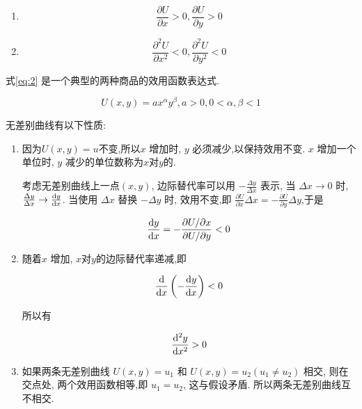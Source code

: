 \documentclass{article}
\begin{document}
\begin{enumerate}
    \item \begin{equation}
        \frac{\partial U}{\partial x} > 0, \frac{\partial U}{\partial y} > 0
    \end{equation}
    \item \begin{equation}
        \frac{\partial^2 U}{\partial x^2} < 0, \frac{\partial^2 U}{\partial y^2} < 0
    \end{equation}
\end{enumerate}

式\ref{eq:2} 是一个典型的两种商品的效用函数表达式.

\begin{equation}
    U(x, y) = ax^\alpha y^\beta, a > 0, 0 < \alpha, \beta < 1
    \label{eq:2}
\end{equation}

无差别曲线有以下性质:

\begin{enumerate}
    \item {}
    
    因为$U(x,y)=u$不变,所以\(x\) 增加时, \(y\) 必须减少,以保持效用不变. \(x\) 增加一个单位时, \(y\) 减少的单位数称为$x$对$y$的.

    考虑无差别曲线上一点\( (x,y) \), 边际替代率可以用 \(-\frac{\Delta y}{\Delta x}\) 表示, 当 $ \Delta x \to 0 $ 时, $ \frac{\Delta y}{\Delta x} \to \frac{\mathrm{d} y}{\mathrm{d} x} $. 当使用 $ \Delta x $ 替换 $ -\Delta y $ 时, 效用不变,即 $ \frac{\partial U}{\partial x}\Delta x = - \frac{\partial U}{\partial y} \Delta y $,于是

    \begin{equation}
        \frac{\mathrm{d} y}{\mathrm{d} x} = -\frac{\partial U/\partial x}{\partial U/\partial y} < 0
    \end{equation}

    \item {}
    
    随着$x$ 增加, $x$对$y$的边际替代率递减,即

    \begin{equation}
        \frac{\mathrm{d}}{\mathrm{d} x}\left( - \frac{\mathrm{d} y}{\mathrm{d} x} \right) < 0
    \end{equation}

    所以有

    \begin{equation}
        \frac{\mathrm{d}^2 y}{\mathrm{d} x^2} > 0
    \end{equation}


    \item {}
    
    如果两条无差别曲线 $U(x,y)=u_1$ 和 $U(x,y)=u_2 (u_1 \ne u_2)$ 相交, 则在交点处, 两个效用函数相等,即 $u_1 = u_2$, 这与假设矛盾. 所以两条无差别曲线互不相交.
    

\end{enumerate}
\end{document}
